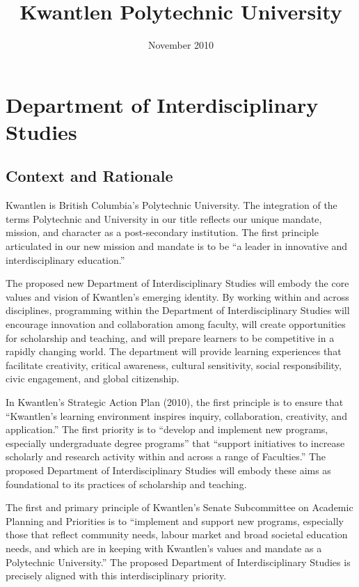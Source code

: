 \documentclass[12pt,DIV11,letterpaper,oneside,abstractoff,headsepline]{scrreprt}
\author{}
\date{November 2010}
\title{\huge\sffamily Kwantlen Polytechnic University}
\begin{document}
\maketitle
\tableofcontents
\chapter[Proposal: Department of Interdisciplinary Studies]{Department of Interdisciplinary Studies}
\section{Context and Rationale}
\label{sec-1}

Kwantlen is British Columbia's Polytechnic University. The integration of the terms Polytechnic and University in our title reflects our unique mandate, mission, and character as a post-secondary institution. The first principle articulated in our new mission and mandate is to be ``a leader in innovative and interdisciplinary education.''

The proposed new Department of Interdisciplinary Studies will embody the core values and vision of Kwantlen’s emerging identity. By working within and across disciplines, programming within the Department of Interdisciplinary Studies will encourage innovation and collaboration among faculty, will create opportunities for scholarship and teaching, and will prepare learners to be competitive in a rapidly changing world. The department will provide learning experiences that facilitate creativity, critical awareness, cultural sensitivity, social responsibility, civic engagement, and global citizenship.

In Kwantlen's Strategic Action Plan (2010), the first principle is to ensure that ``Kwantlen's learning environment inspires inquiry, collaboration, creativity, and application.'' The first priority is to ``develop and implement new programs, especially undergraduate degree programs'' that ``support initiatives to increase scholarly and research activity within and across a range of Faculties.'' The proposed Department of Interdisciplinary Studies will embody these aims as foundational to its practices of scholarship and teaching.

The first and primary principle of Kwantlen's Senate Subcommittee on Academic Planning and Priorities is to ``implement and support new programs, especially those that reflect community needs, labour market and broad societal education needs, and which are in keeping with Kwantlen’s values and mandate as a Polytechnic University.'' The proposed Department of Interdisciplinary Studies is precisely aligned with this interdisciplinary priority. 
\end{document}
